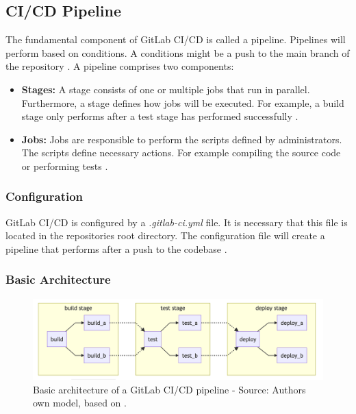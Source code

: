 \subsection{CI/CD Pipeline}

The fundamental component of GitLab CI/CD is called a pipeline. Pipelines will perform based on conditions. A conditions might be a push to the main branch of the repository \cite{Gitlab2020Docs}. A pipeline comprises two components:

\begin{itemize}
\item \textbf{Stages:} A stage consists of one or multiple jobs that run in parallel. Furthermore, a stage defines how jobs will be executed. For example, a build stage only performs after a test stage has performed successfully \cite{Gitlab2020Docs}.

\item \textbf{Jobs:} Jobs are responsible to perform the scripts defined by administrators. The scripts define necessary actions. For example compiling the source code or performing tests \cite{Gitlab2020Docs}.
\end{itemize}


\subsubsection{Configuration}
GitLab CI/CD is configured by a \textit{.gitlab-ci.yml} file. It is necessary that this file is located in the repositories root directory.
The configuration file will create a pipeline that performs after a push to the codebase \cite{Gitlab2020Docs}.


\subsubsection{Basic Architecture}

\begin{figure}[h]
\centering
\includegraphics[scale=1]{images/04_technical_background/gitlab/basic-pipeline-architecture}
\caption{Basic architecture of a GitLab CI/CD pipeline - Source: Authors own model, based on \cite{Gitlab2020Docs}.}
\label{fig:gitlab-basic_pipeline}
\end{figure}


